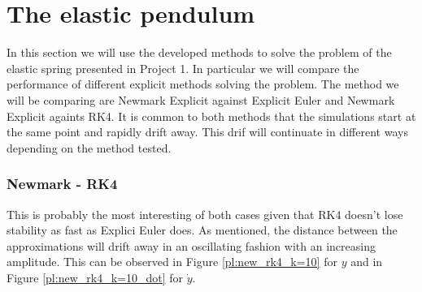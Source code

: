 \documentclass{report}
\begin{document}
\section*{The elastic pendulum}

In this section we will use the developed methods to solve the problem of the elastic spring presented in Project 1. In particular we will compare the performance of different explicit methods solving the problem. The method we will be comparing are Newmark Explicit against Explicit Euler and Newmark Explicit againts RK4.
\bigbreak
It is common to both methods that the simulations start at the same point and rapidly drift away. This drif will continuate in different ways depending on the method tested.

\subsubsection*{Newmark - RK4}

This is probably the most interesting of both cases given that RK4 doesn't lose stability as fast as Explici Euler does. As mentioned, the distance between the approximations will drift away in an oscillating fashion with an increasing amplitude. This can be observed in Figure \ref{pl:new_rk4_k=10} for $y$ and in Figure \ref{pl:new_rk4_k=10_dot} for $\dot{y}$.
\end{document}
